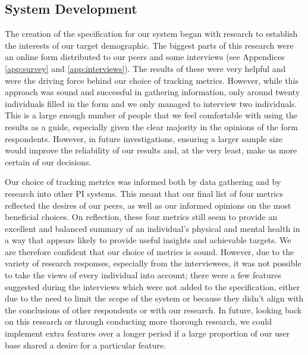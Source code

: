 \documentclass[11pt]{article}
\begin{document}
\subsection{System Development} 

The creation of the specification for our system began with research to
establish the interests of our target demographic. The biggest parts of this
research were an online form distributed to our peers and some interviews (see
Appendices \ref{app:survey} and \ref{app:interviews}). The results of these
were very helpful and were the driving force behind our choice of tracking
metrics. However, while this approach was sound and successful in gathering
information, only around twenty individuals filled in the form and we only
managed to interview two individuals. This is a large enough number of people
that we feel comfortable with using the results as a guide, especially given
the clear majority in the opinions of the form respondents. However, in future
investigations, ensuring a larger sample size would improve the reliability of
our results and, at the very least, make us more certain of our decisions.\par

Our choice of tracking metrics was informed both by data gathering and by
research into other PI systems. This meant that our final list of four metrics
reflected the desires of our peers, as well as our informed opinions on the
most beneficial choices. On reflection, these four metrics still seem to
provide an excellent and balanced summary of an individual's physical and
mental health in a way that appears likely to provide useful insights and
achievable targets. We are therefore confident that our choice of metrics is
sound. However, due to the variety of research responses, especially from the
interviewees, it was not possible to take the views of every individual into
account; there were a few features suggested during the interviews which were
not added to the specification, either due to the need to limit the scope of
the system or because they didn't align with the conclusions of other
respondents or with our research. In future, looking back on this research or
through conducting more thorough research, we could implement extra features
over a longer period if a large proportion of our user base shared a desire for
a particular feature.\par

\newpage
\end{document}
